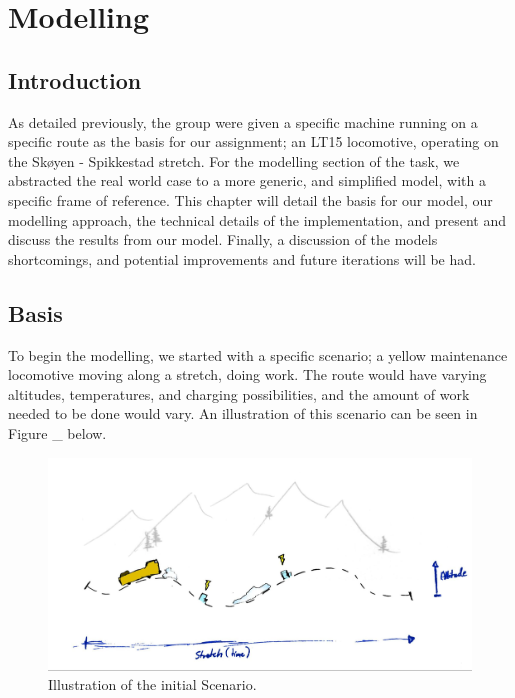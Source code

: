 \documentclass{article}
\begin{document}
\section{Modelling}

\subsection{Introduction}

As detailed previously, the group were given a specific machine running on a specific route as the basis for our assignment; an LT15 locomotive, operating on the Skøyen - Spikkestad stretch. For the modelling section of the task, we abstracted the real world case to a more generic, and simplified model, with a specific frame of reference. This chapter will detail the basis for our model, our modelling approach, the technical details of the implementation, and present and discuss the results from our model. Finally, a discussion of the models shortcomings, and potential improvements and future iterations will be had.

\subsection{Basis}

To begin the modelling, we started with a specific scenario; a yellow maintenance locomotive moving along a stretch, doing work. The route would have varying altitudes, temperatures, and charging possibilities, and the amount of work needed to be done would vary. An illustration of this scenario can be seen in Figure \_ below.

\begin{figure}[H]
    \centering
    \includegraphics*[width=1\textwidth]{img/image11.jpg}
    \caption{Illustration of the initial Scenario.}
\end{figure}
\end{document}
